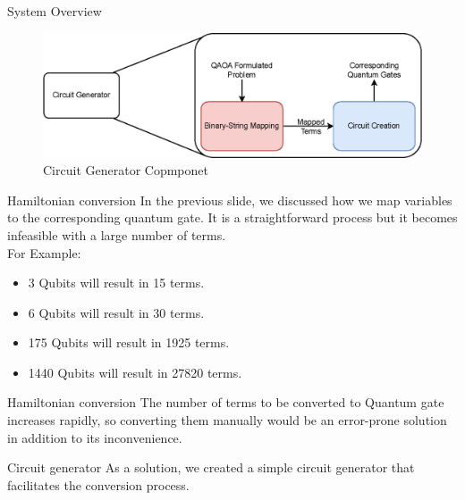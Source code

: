 \documentclass[14pt, aspectratio=169]{beamer}
\begin{document}
\begin{frame}{System Overview}
    \begin{figure}
        \centering
        \includegraphics[width=\linewidth]{images/Diagram/CircuitGenerator.eps}
        \caption{Circuit Generator Copmponet}
        \label{fig:circiut_generator}
    \end{figure}
\end{frame}

\begin{frame}{Hamiltonian conversion}
    In the previous slide, we discussed how we map variables to the corresponding quantum gate.
    It is a straightforward process but it becomes infeasible with a large number of terms.\\
    \vspace{2mm}
    For Example:\\
    \begin{itemize}
        \item 3 Qubits will result in 15 terms.
        \item 6 Qubits will result in 30 terms.
        \item 175 Qubits will result in 1925 terms.
        \item 1440 Qubits will result in 27820 terms.
    \end{itemize}
\end{frame}

\begin{frame}{Hamiltonian conversion}
    The number of terms to be converted to Quantum gate increases rapidly, so converting them manually would be an error-prone solution in addition to its inconvenience.\\
\end{frame}

\begin{frame}{Circuit generator}
    As a solution, we created a simple circuit generator that facilitates the conversion process.\\
\end{frame}
\end{document}
